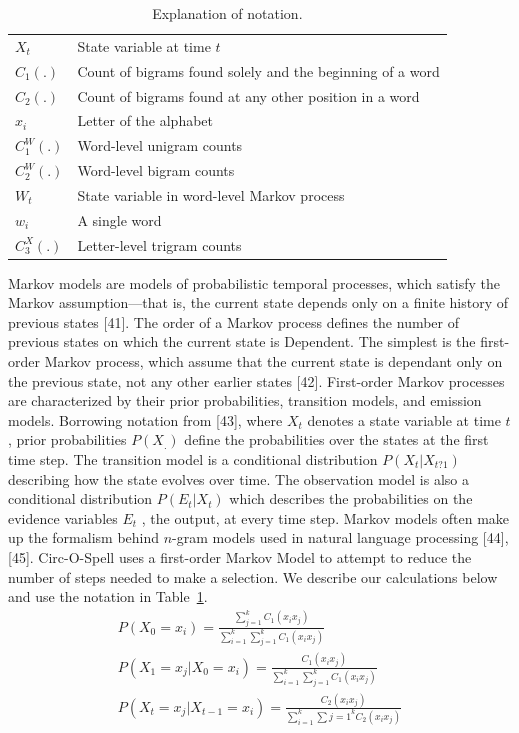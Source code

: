 \documentclass[12pt,titlepage]{article}
\begin{document}
\begin{table}
\caption{Explanation of notation.}
\begin{center}
\begin{tabular}{ll}
\hline\hline
$X_t$ & State variable at time $t$ \\
$C_1(.)$ & Count of bigrams found solely and the beginning of a word \\
$C_2(.)$ & Count of bigrams found at any other position in a word \\
$x_i$ & Letter of the alphabet \\
$C_1^W(.)$ & Word-level unigram counts \\
$C_2^W(.)$ & Word-level bigram counts \\
$W_t$ & State variable in word-level Markov process \\
$w_i$ & A single word \\
$C_3^X(.)$ & Letter-level trigram counts \\
\hline\hline
\end{tabular}
\end{center}
\label{table:Not}
\end{table}

Markov models are models of probabilistic temporal processes, which satisfy the Markov assumption---that
is, the current state depends only on a finite history of previous states [41].  The order of a Markov 
process defines the number of previous states on which the current state is Dependent.  The simplest is 
the first-order Markov process, which assume that the current state is dependant only on the previous 
state, not any other earlier states [42].  First-order Markov processes are characterized by their prior
probabilities, transition models, and emission models.  Borrowing notation from [43], where $X_t$  denotes
a state variable at time $t$, prior probabilities $P(X_.)$ define the probabilities over the states at the first 
time step.  The transition model is a conditional distribution $P(X_t | X_{t?1})$  describing how the state 
evolves over time.  The observation model is also a conditional distribution $P(E_t | X_t)$ which describes 
the probabilities on the evidence variables $E_t$ , the output, at every time step.  Markov models often 
make up the formalism behind $n$-gram models used in natural language processing [44], [45]. 
Circ-O-Spell uses a first-order Markov Model to attempt to reduce the number of steps needed to make 
a selection.  We describe our calculations below and use the notation in Table~\ref{table:Not}.
\begin{gather*}
P(X_0 = x_i) = \frac{\displaystyle \sum_{j=1}^k C_1(x_i x_j)}{\displaystyle \sum_{i=1}^k \sum_{j=1}^k C_1(x_i x_j)} \tag{1} \\
P(X_1 = x_j | X_0 = x_i) = \frac{C_1(x_i x_j)}{\displaystyle \sum_{i=1}^k \sum_{j=1}^k C_1(x_i x_j)} \tag{2} \\
P(X_t = x_j | X_{t-1} = x_i) = \frac{C_2(x_i x_j)}{\displaystyle \sum_{i=1}^k \sum{j=1}^k C_2(x_i x_j)} \tag{3}
\end{gather*}
\end{document}
